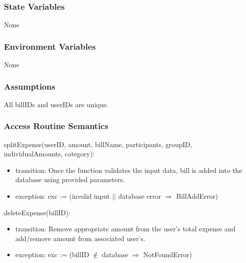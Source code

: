 \documentclass[12pt, titlepage]{article}
\begin{document}
\subsubsection{State Variables}

None


\subsubsection{Environment Variables}

None


\subsubsection{Assumptions}

All billIDs and userIDs are unique.


\subsubsection{Access Routine Semantics}

\noindent splitExpense(userID, amount, billName, participants, groupID, individualAmounts, category):
\begin{itemize}
\item transition: Once the function validates the input data, bill is added into the database using provided parameters.
\item exception: exc := (invalid input $\vert\vert$ database error $\Rightarrow$ BillAddError)
\end{itemize}

\noindent deleteExpense(billID):
\begin{itemize}
\item transition: Remove appropriate amount from the user's total expense and add/remove amount from associated user's.
\item exception: exc := (billID $\notin$ database $\Rightarrow$ NotFoundError)
\end{itemize}
\end{document}
